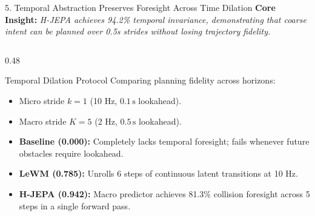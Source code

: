 \documentclass[aspectratio=169, 10pt]{beamer}
\begin{document}
\begin{frame}{5. Temporal Abstraction Preserves Foresight Across Time Dilation}
  \textbf{Core Insight:} \textit{H-JEPA achieves 94.2\% temporal invariance, demonstrating that coarse intent can be planned over 0.5s strides without losing trajectory fidelity.}

  \vspace{0.2cm}
  \begin{columns}[T]
    \begin{column}{0.48\textwidth}
      \begin{block}{Temporal Dilation Protocol}
        \small
        Comparing planning fidelity across horizons:
        \begin{itemize}
          \item Micro stride $k=1$ (10 Hz, $0.1\,\mathrm{s}$ lookahead).
          \item Macro stride $K=5$ (2 Hz, $0.5\,\mathrm{s}$ lookahead).
          \item \textbf{Baseline (\alert{0.000}):} Completely lacks temporal foresight; fails whenever future obstacles require lookahead.
          \item \textbf{LeWM (\textbf{0.785}):} Unrolls 6 steps of continuous latent transitions at 10 Hz.
          \item \textbf{H-JEPA (\textbf{0.942}):} Macro predictor achieves 81.3\% collision foresight across 5 steps in a single forward pass.
        \end{itemize}
      \end{block}
    \end{column}


\end{columns}
\end{frame}
\end{document}
